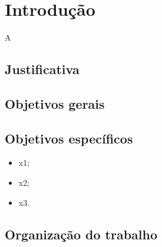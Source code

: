 \chapter{Introdução} \label{ch:Introdução}
    A 




    \section{Justificativa} \label{sec:Justificativa}



    \section{Objetivos gerais} \label{sec:Objetivos-gerais}


    \section{Objetivos específicos} \label{sec:Objetivos-específicos}
    
    \begin{itemize}
    	\item x1;
        \item x2;
        \item x3.
    \end{itemize}
    
    \section{Organização do trabalho} \label{sec:Organização-do-trabalho}

